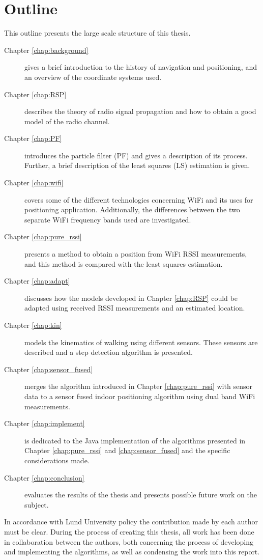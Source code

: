 \documentclass{LTHthesis}
\begin{document}
\section{Outline}
%
This outline presents the large scale structure of this thesis.
%
\begin{description}
\item[Chapter \ref{chap:background}] gives a brief introduction to the history of navigation and positioning, and an overview of the coordinate systems used.  
%
\item[Chapter \ref{chap:RSP}] describes the theory of radio signal propagation and how to obtain a good model of the radio channel. 
%
\item[Chapter \ref{chap:PF}] introduces the particle filter (PF) and gives a description of its process. Further, a brief description of the least squares (LS) estimation is given. 
%
\item[Chapter \ref{chap:wifi}] covers some of the different technologies concerning WiFi and its uses for positioning application. Additionally, the differences between the two separate WiFi frequency bands used are investigated. 
%
\item[Chapter \ref{chap:pure_rssi}] presents a method to obtain a position from WiFi RSSI measurements, and this method is compared with the least squares estimation.  
%
\item[Chapter \ref{chap:adapt}] discusses how the models developed in Chapter \ref{chap:RSP} could be adapted using received RSSI measurements and an estimated location.
%
\item[Chapter \ref{chap:kin}] models the kinematics of walking using different sensors. These sensors are described and a step detection algorithm is presented. 
%
\item[Chapter \ref{chap:sensor_fused}] merges the algorithm introduced in Chapter \ref{chap:pure_rssi} with sensor data to a sensor fused indoor positioning algorithm using dual band WiFi measurements.
%
\item[Chapter \ref{chap:implement}] is dedicated to the Java implementation of the algorithms presented in Chapter \ref{chap:pure_rssi} and \ref{chap:sensor_fused} and the specific considerations made. 
%
\item[Chapter \ref{chap:conclusion}] evaluates the results of the thesis and presents possible future work on the subject. 
%
\end{description}
%
In accordance with Lund University policy the contribution made by each author must be clear. During the process of creating this thesis, all work has been done in collaboration between the authors, both concerning the process of developing and implementing the algorithms, as well as condensing the work into this report. 
%
\end{document}
